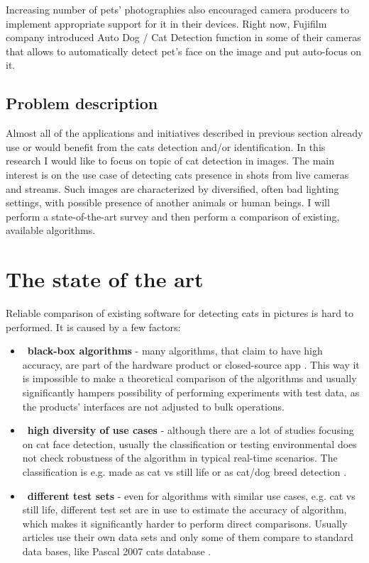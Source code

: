 \documentclass[hyperref]{acmtrans2e}
\begin{document}
Increasing number of pets' photographies also encouraged camera producers to implement appropriate support for it in their devices. Right now, Fujifilm company introduced Auto Dog / Cat Detection function \cite{FujiFilm:2009} in some of their cameras that allows to automatically detect pet's face on the image and put auto-focus on it. 
 
\subsection{Problem description}
Almost all of the applications and initiatives described in previous section already use or would benefit from the cats detection and/or identification. In this research I would like to focus on topic of cat detection in images. The main interest is on the use case of detecting cats presence in shots from live cameras and streams. Such images are characterized by  diversified, often bad lighting settings, with possible presence of another animals or human beings. I will perform a state-of-the-art survey and then perform a comparison of existing, available algorithms. 

\section{The state of the art}
Reliable comparison of existing software for detecting cats in pictures is hard to performed. It is caused by a few factors:
\begin{itemize}
\item~\textbf{black-box algorithms} - many algorithms, that claim to have high accuracy, are part of the hardware product \cite{CatFi:2015} or closed-source app \cite{PiP:2013}. This way it is impossible to make a theoretical comparison of the algorithms and usually significantly hampers possibility of performing experiments with test data, as the products' interfaces are not adjusted to bulk operations. 
\item~\textbf{high diversity of use cases} - although there are a lot of studies focusing on cat face detection, usually the classification or testing environmental does not check robustness of the algorithm in typical real-time scenarios. The classification is e.g. made as cat vs still life \cite{features:2007,edges:2011} or as cat/dog breed detection \cite{breed:2012}.
\item~\textbf{different test sets} - even for algorithms with similar use cases, e.g. cat vs still life, different test set are in use to estimate the accuracy of algorithm, which makes it significantly harder to perform direct comparisons. Usually articles use their own data sets \cite{breed:2012,features:2007,edges:2011} and only some of them compare to standard data bases, like Pascal 2007 cats database \cite{breed:2012}. 
\end{itemize}
\end{document}
